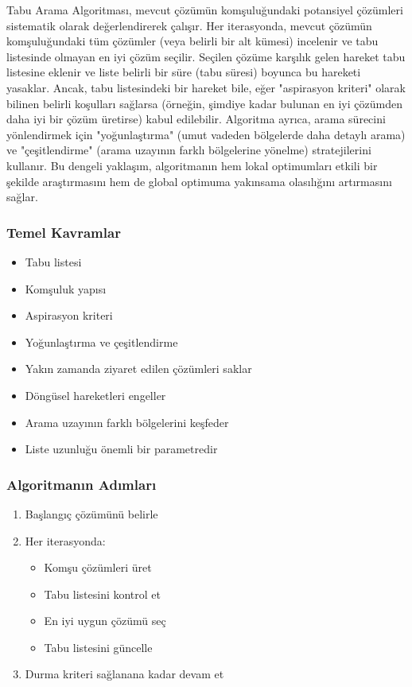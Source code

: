 Tabu Arama Algoritması, mevcut çözümün komşuluğundaki potansiyel çözümleri sistematik olarak değerlendirerek çalışır. Her iterasyonda, mevcut çözümün komşuluğundaki tüm çözümler (veya belirli bir alt kümesi) incelenir ve tabu listesinde olmayan en iyi çözüm seçilir. Seçilen çözüme karşılık gelen hareket tabu listesine eklenir ve liste belirli bir süre (tabu süresi) boyunca bu hareketi yasaklar. Ancak, tabu listesindeki bir hareket bile, eğer "aspirasyon kriteri" olarak bilinen belirli koşulları sağlarsa (örneğin, şimdiye kadar bulunan en iyi çözümden daha iyi bir çözüm üretirse) kabul edilebilir. Algoritma ayrıca, arama sürecini yönlendirmek için "yoğunlaştırma" (umut vadeden bölgelerde daha detaylı arama) ve "çeşitlendirme" (arama uzayının farklı bölgelerine yönelme) stratejilerini kullanır. Bu dengeli yaklaşım, algoritmanın hem lokal optimumları etkili bir şekilde araştırmasını hem de global optimuma yakınsama olasılığını artırmasını sağlar.

\subsubsection{Temel Kavramlar}
\begin{itemize}
    \item Tabu listesi
    \item Komşuluk yapısı
    \item Aspirasyon kriteri
    \item Yoğunlaştırma ve çeşitlendirme
\end{itemize}

\begin{tcolorbox}[title=Tabu Listesinin Rolü]
\begin{itemize}
    \item Yakın zamanda ziyaret edilen çözümleri saklar
    \item Döngüsel hareketleri engeller
    \item Arama uzayının farklı bölgelerini keşfeder
    \item Liste uzunluğu önemli bir parametredir
\end{itemize}
\end{tcolorbox}

\subsubsection{Algoritmanın Adımları}
\begin{enumerate}
    \item Başlangıç çözümünü belirle
    \item Her iterasyonda:
        \begin{itemize}
            \item Komşu çözümleri üret
            \item Tabu listesini kontrol et
            \item En iyi uygun çözümü seç
            \item Tabu listesini güncelle
        \end{itemize}
    \item Durma kriteri sağlanana kadar devam et
\end{enumerate}

